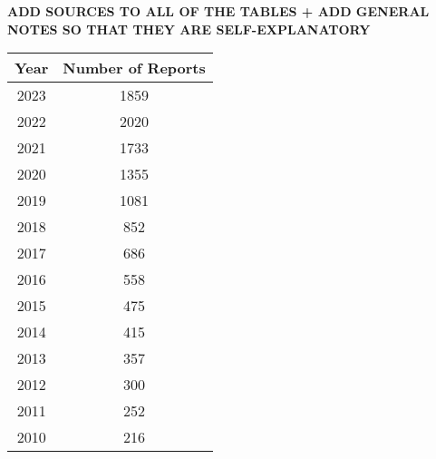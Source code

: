 \documentclass[12pt]{article}
\begin{document}
\textbf{ADD SOURCES TO ALL OF THE TABLES + ADD GENERAL NOTES SO THAT THEY ARE SELF-EXPLANATORY}


\small
\centering

\begin{table}[h]
    \label{tab:sust_reps}
    \centering
        \begin{tabular}{cc}
            \toprule
            Year & Number of Reports\\
            \midrule
            2023 & 1859\\
            2022 & 2020\\
            2021 & 1733\\
            2020 & 1355\\
            2019 & 1081\\
            2018 & 852\\
            2017 & 686\\
            2016 & 558\\
            2015 & 475\\
            2014 & 415\\
            2013 & 357\\
            2012 & 300\\
            2011 & 252\\
            2010 & 216\\
            \bottomrule
        \end{tabular}
\end{table}

\end{document}
